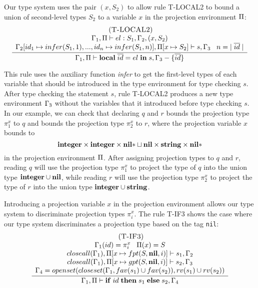Our type system uses the pair $(x,S_{2})$ to allow rule
\textsc{T-LOCAL2} to bound a union of second-level types $S_{2}$
to a variable $x$ in the projection environment $\Pi$:
\[
\begin{array}{c}
\; (\textsc{T-LOCAL2})\\
\dfrac{\begin{array}{c}
       \Gamma_{1}, \Pi \vdash el:S_{1}, \Gamma_{2}, (x,S_{2})\\
       \Gamma_{2}[id_{1} \mapsto infer(S_{1},1), ..., id_{n} \mapsto infer(S_{1},n)], \Pi[x \mapsto S_{2}] \vdash s, \Gamma_{3} \;\;\;
       n = |\;\overline{id}\;|  
       \end{array}}
      {\Gamma_{1}, \Pi \vdash \mathbf{local} \; \overline{id} = el \; \mathbf{in} \; s, \Gamma_{3} - \{\overline{id}\}}
\end{array}
\]

This rule uses the auxiliary function \emph{infer} to get the
first-level types of each variable that should be introduced in
the type environment for type checking $s$.
After type checking the statement $s$, rule \textsc{T-LOCAL2} produces a
new type environment $\Gamma_{3}$ without the variables that it introduced
before type checking $s$.
In our example, we can check that declaring $q$ and $r$
bounds the projection type $\pi_{1}^{x}$ to $q$ and
bounds the projection type $\pi_{2}^{x}$ to $r$, where the projection variable $x$ bounds to 
\[
\mathbf{integer} \times \mathbf{integer} \times \mathbf{nil}{*} \sqcup \mathbf{nil} \times \mathbf{string} \times \mathbf{nil}{*}
\]
in the projection environment $\Pi$. 
After assigning projection types to $q$ and $r$, reading $q$ will
use the projection type $\pi_{1}^{x}$ to project the type of $q$
into the union type $\mathbf{integer} \cup \mathbf{nil}$, while reading $r$ will
use the projection type $\pi_{2}^{x}$ to project the type of $r$
into the union type $\mathbf{integer} \cup \mathbf{string}$.

Introducing a projection variable $x$ in the projection environment allows our
type system to discriminate projection types $\pi_{i}^{x}$.
The rule \textsc{T-IF3} shows the case where our type system
discriminates a projection type based on the tag \texttt{nil}:
\[
\begin{array}{c}
\; (\textsc{T-IF3})\\
\dfrac{\begin{array}{c}
       \Gamma_{1}(id) = \pi_{i}^{x} \;\;\; \Pi(x) = S\\
       closeall(\Gamma_{1}), \Pi[x \mapsto fpt(S,\mathbf{nil},i)] \vdash s_{1}, \Gamma_{2} \\
       closeall(\Gamma_{1}), \Pi[x \mapsto gpt(S,\mathbf{nil},i)] \vdash s_{2}, \Gamma_{3} \\
       \Gamma_{4} = openset(closeset(\Gamma_{1}, fav(s_{1}) \cup fav(s_{2})),rv(s_{1}) \cup rv(s_{2}))
      \end{array}}
      {\Gamma_{1}, \Pi \vdash \mathbf{if} \; id \; \mathbf{then} \; s_{1} \; \mathbf{else} \; s_{2}, \Gamma_{4}}
\end{array}
\]

